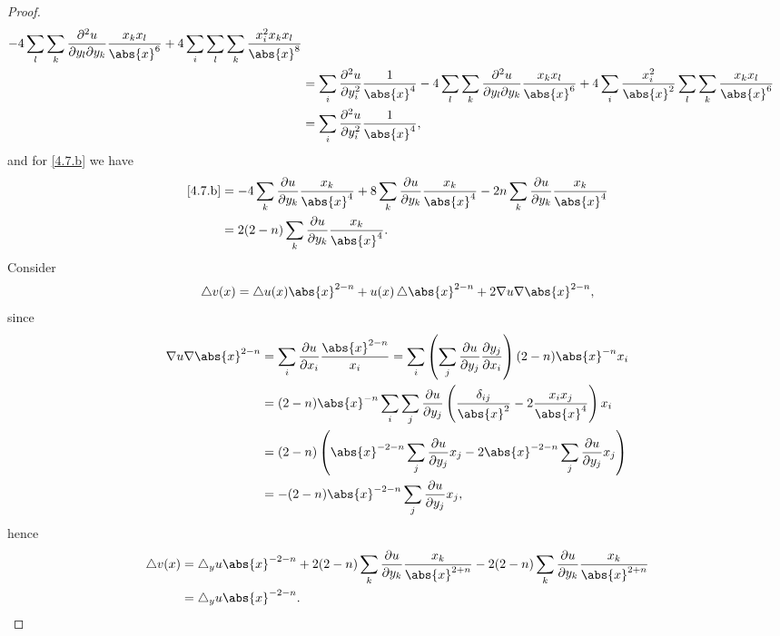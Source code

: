 \documentclass[a4paper]{article}
\newcommand*\Laplace{\mathop{}\!\mathbin\bigtriangleup}
\DeclarePairedDelimiter{\abs}\lvert\rvert
\begin{document}
\begin{proof}
\begin{align*}
- 4\sum_l\sum_k\frac{\partial^2 u}{\partial y_l\partial y_k}\frac{x_kx_l}{\abs{x}^6}
+ 4\sum_i\sum_l\sum_k\frac{x_i^2x_kx_l}{\abs{x}^8} \\
&= \sum_i\frac{\partial^2 u}{\partial y_i^2}\frac{1}{\abs{x}^4}
- 4\sum_l\sum_k\frac{\partial^2 u}{\partial y_l\partial y_k}\frac{x_kx_l}{\abs{x}^6}
+ 4\sum_i\frac{x^2_i}{\abs{x}^2}\sum_l\sum_k\frac{x_kx_l}{\abs{x}^6} \\
&= \sum_i\frac{\partial^2u}{\partial y_i^2}\frac{1}{\abs{x}^4},
\end{align*}
and for \eqref{4.7.b} we have
\begin{align*}
\eqref{4.7.b} &= -4\sum_k\frac{\partial u}{\partial y_k}\frac{x_k}{\abs{x}^4}
+ 8\sum_k\frac{\partial u}{\partial y_k}\frac{x_k}{\abs{x}^4}
- 2n\sum_k\frac{\partial u}{\partial y_k}\frac{x_k}{\abs{x}^4} \\
&= 2(2-n)\sum_k\frac{\partial u}{\partial y_k}\frac{x_k}{\abs{x}^4}.
\end{align*}
Consider
\begin{align*}
\Laplace v(x) = \Laplace{u(x)}\abs{x}^{2-n} + u(x)\Laplace{\abs{x}^{2-n}} + 2\nabla{u}\nabla{\abs{x}^{2-n}},
\end{align*}
since
\begin{align*}
\nabla{u}\nabla{\abs{x}^{2-n}} &= \sum_i\frac{\partial u}{\partial x_i}\frac{\abs{x}^{2-n}}{x_i}
= \sum_i\left(\sum_j\frac{\partial u}{\partial y_j}\frac{\partial y_j}{\partial x_i}\right)(2-n)\abs{x}^{-n}x_i \\
&= (2-n)\abs{x}^{-n}\sum_i\sum_j\frac{\partial u}{\partial y_j}
\left(\frac{\delta_{ij}}{\abs{x}^2} - 2\frac{x_ix_j}{\abs{x}^4}\right)x_i \\
&= (2-n)\left(\abs{x}^{-2-n}\sum_j\frac{\partial u}{\partial y_j}x_j
-2\abs{x}^{-2-n}\sum_j\frac{\partial u}{\partial y_j}x_j\right) \\
&= -(2-n)\abs{x}^{-2-n}\sum_j\frac{\partial u}{\partial y_j}x_j,
\end{align*}
hence
\begin{align*}
\Laplace v(x) &= \Laplace_yu\abs{x}^{-2-n} + 2(2-n)\sum_k\frac{\partial u}{\partial y_k}\frac{x_k}{\abs{x}^{2+n}}
- 2(2-n)\sum_k\frac{\partial u}{\partial y_k}\frac{x_k}{\abs{x}^{2+n}} \\
&= \Laplace_yu\abs{x}^{-2-n}.
\end{align*}
\end{proof}
\end{document}
